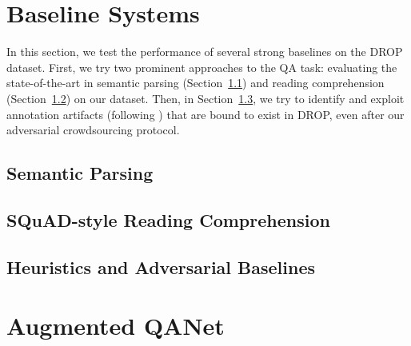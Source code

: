 \documentclass[11pt,a4paper]{article}
\newcommand{\secref}[1]{Section~\ref{sec:#1}}
\newcommand{\drop}[0]{DROP}
\begin{document}
\section{Baseline Systems}
\label{sec:baselines}

In this section, we test the performance of several strong baselines on the
\drop~ dataset.
First, we try two prominent approaches to the QA task: evaluating
the state-of-the-art in semantic parsing (\secref{semparse}) and reading comprehension (\secref{rc}) on our dataset.
Then, in \secref{heuristics},
we try to identify and exploit annotation artifacts (following \cite{Gururangan:2018,Kaushik2018HowMR})
that are bound to exist in \drop, even after our adversarial crowdsourcing protocol.

\subsection{Semantic Parsing}
\label{sec:semparse}


\subsection{SQuAD-style Reading Comprehension}
\label{sec:rc}


\subsection{Heuristics and Adversarial Baselines}
\label{sec:heuristics}



\section{Augmented QANet}
\label{sec:model}

\end{document}
